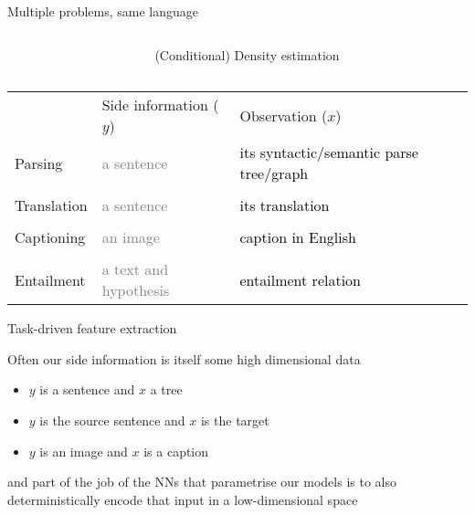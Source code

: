 \begin{frame}{Multiple problems, same language}



\begin{small}

\begin{columns}
\begin{column}{0.3\textwidth}
\end{column}
\begin{column}{0.6\textwidth}
\alert{(Conditional) Density estimation}
\end{column}

\end{columns}

\begin{tabular}{p{2cm} p{4cm} p{4cm}}
 & Side information ($y$) & Observation ($x$) \\
Parsing &   \textcolor{gray}{a sentence} & \textcolor{black}{its syntactic/semantic parse tree/graph} \\
&&\\
Translation &  \textcolor{gray}{a sentence} & \textcolor{black}{its translation} \\
&&\\
Captioning &  \textcolor{gray}{an image} & \textcolor{black}{caption in English} \\
&&\\
Entailment  & \textcolor{gray}{a text and hypothesis} & \textcolor{black}{entailment relation}
\end{tabular}
\end{small}

\end{frame}


\begin{frame}{Task-driven feature extraction}

Often our side information is itself some high dimensional data
\begin{itemize}
	\item $y$ is a sentence and $x$ a tree
	\item $y$ is the source sentence and $x$ is the target
	\item $y$ is an image and $x$ is a caption
\end{itemize}
and part of the job of the NNs that parametrise our models is to also \alert{deterministically} encode that input in a low-dimensional space


\end{frame}


